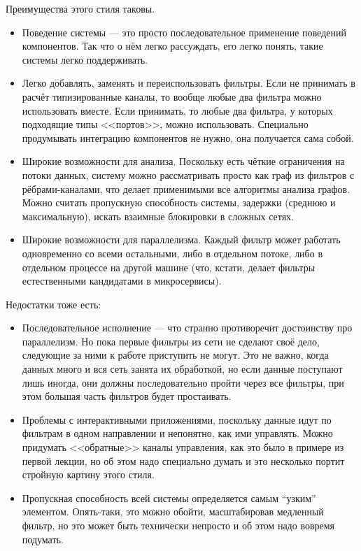 \documentclass{../../text-style}
\begin{document}
Преимущества этого стиля таковы.

\begin{itemize}
    \item Поведение системы --- это просто последовательное применение поведений компонентов. Так что о нём легко рассуждать, его легко понять, такие системы легко поддерживать.
    \item Легко добавлять, заменять и переиспользовать фильтры. Если не принимать в расчёт типизированные каналы, то вообще любые два фильтра можно использовать вместе. Если принимать, то любые два фильтра, у которых подходящие типы <<портов>>, можно использовать. Специально продумывать интеграцию компонентов не нужно, она получается сама собой.
    \item Широкие возможности для анализа. Поскольку есть чёткие ограничения на потоки данных, систему можно рассматривать просто как граф из фильтров с рёбрами-каналами, что делает применимыми все алгоритмы анализа графов. Можно считать пропускную способность системы, задержки (среднюю и максимальную), искать взаимные блокировки в сложных сетях.
    \item Широкие возможности для параллелизма. Каждый фильтр может работать одновременно со всеми остальными, либо в отдельном потоке, либо в отдельном процессе на другой машине (что, кстати, делает фильтры естественными кандидатами в микросервисы).
\end{itemize}

Недостатки тоже есть:

\begin{itemize}
    \item Последовательное исполнение --- что странно противоречит достоинству про параллелизм. Но пока первые фильтры из сети не сделают своё дело, следующие за ними к работе приступить не могут. Это не важно, когда данных много и вся сеть занята их обработкой, но если данные поступают лишь иногда, они должны последовательно пройти через все фильтры, при этом большая часть фильтров будет простаивать.
    \item Проблемы с интерактивными приложениями, поскольку данные идут по  фильтрам в одном направлении и непонятно, как ими управлять. Можно придумать <<обратные>> каналы управления, как это было в примере из первой лекции, но об этом надо специально думать и это несколько портит стройную картину этого стиля.
    \item Пропускная способность всей системы определяется самым ``узким'' элементом. Опять-таки, это можно обойти, масштабировав медленный фильтр, но это может быть технически непросто и об этом надо вовремя подумать.
\end{itemize}
\end{document}
